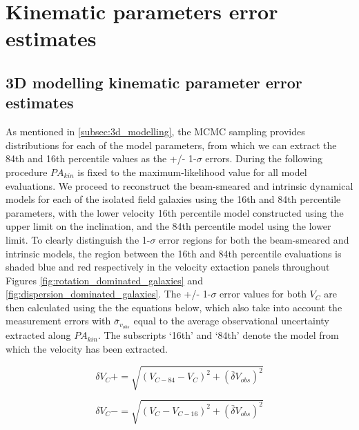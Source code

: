 \documentclass[fleqn,usenatbib]{mn2e}
\begin{document}
\section{Kinematic parameters error estimates}\label{app:kin_error_estimates}

\subsection{3D modelling kinematic parameter error estimates}\label{appsubsec:model_errors}
As mentioned in \cref{subsec:3d_modelling}, the MCMC sampling provides distributions for each of the model parameters, from which we can extract the 84th and 16th percentile values as the +/- 1-$\sigma$ errors.
During the following procedure $PA_{kin}$ is fixed to the maximum-likelihood value for all model evaluations.
We proceed to reconstruct the beam-smeared and intrinsic dynamical models for each of the isolated field galaxies using the 16th and 84th percentile parameters, with the lower velocity 16th percentile model constructed using the upper limit on the inclination, and the 84th percentile model using the lower limit.
To clearly distinguish the 1-$\sigma$ error regions for both the beam-smeared and intrinsic models, the region between the 16th and 84th percentile evaluations is shaded blue and red respectively in the velocity extaction panels throughout Figures \ref{fig:rotation_dominated_galaxies} and \ref{fig:dispersion_dominated_galaxies}.
The +/- 1-$\sigma$ error values for both $V_{C}$ are then calculated using the the equations below, which also take into account the measurement errors with $\bar{\sigma}_{v_{obs}}$ equal to the average observational uncertainty extracted along $PA_{kin}$.
The subscripts `16th' and `84th' denote the model from which the velocity has been extracted.


\begin{equation}\label{eq:VC_plus}
   \delta V_{C}+ = \sqrt{\left(V_{C-84} - V_{C}\right)^{2} + \left(\bar{\delta}V_{obs}\right)^{2}}
\end{equation}

\begin{equation}\label{eq:VC_minus}
   \delta V_{C}- = \sqrt{\left(V_{C} - V_{C-16}\right)^{2}  + \left(\bar{\delta}V_{obs}\right)^{2}}
\end{equation}
\end{document}
